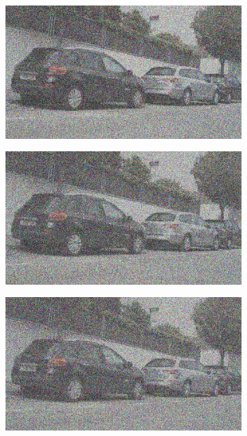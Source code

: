 \documentclass[a4paper]{ctexart}
\begin{document}
\begin{figure}[htbp]
\begin{subfigure}{0.08\textwidth}
				\label{fig：Gamma=0.8, Gauss Noise = 0.7}
			\end{subfigure}
			\begin{subfigure}{0.08\textwidth}
				\captionsetup{font=scriptsize}
				\includegraphics[width=\linewidth]{picture/Edge Detection/degrade/RGB_001 Gamma=0.8, Gauss Noise=0.8}
				\label{fig：Gamma=0.8, Gauss Noise = 0.8}
			\end{subfigure}
			\begin{subfigure}{0.08\textwidth}
				\captionsetup{font=scriptsize}
				\includegraphics[width=\linewidth]{picture/Edge Detection/degrade/RGB_001 Gamma=0.8, Gauss Noise=0.9}
				\label{fig：Gamma=0.8, Gauss Noise = 0.9}
			\end{subfigure}
			\begin{subfigure}{0.08\textwidth}
				\captionsetup{font=scriptsize}
				\includegraphics[width=\linewidth]{picture/Edge Detection/degrade/RGB_001 Gamma=0.8, Gauss Noise=1.0}

\end{subfigure}
\end{figure}
\end{document}
